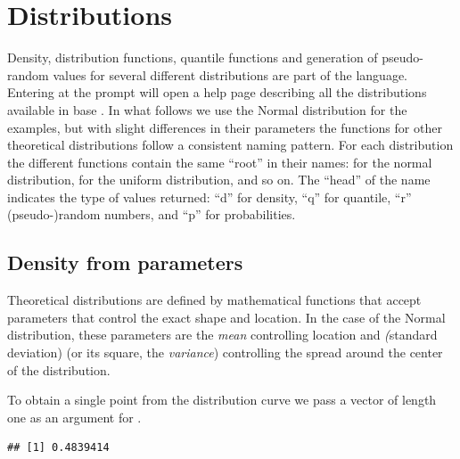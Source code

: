 \documentclass[krantz2]{krantz}\usepackage{knitr}
\begin{document}
\section{Distributions}
Density, distribution functions, quantile functions and generation of pseudo-random values for several different distributions are part of the \Rlang language. Entering  at the \Rlang prompt will open a help page describing all the distributions available in base \Rlang. In what follows we use the Normal distribution for the examples, but with slight differences in their parameters the functions for other theoretical distributions follow a consistent naming pattern. For each distribution the different functions contain the same ``root'' in their names:  for the normal distribution,  for the uniform distribution, and so on. The ``head'' of the name indicates the type of values returned: ``d'' for density, ``q'' for quantile, ``r'' (pseudo-)random numbers, and ``p'' for probabilities.

\subsection{Density from parameters}
Theoretical distributions are defined by mathematical functions that accept parameters that control the exact shape and location. In the case of the Normal distribution, these parameters are the \emph{mean} controlling location and \emph(standard deviation) (or its square, the \emph{variance}) controlling the spread around the center of the distribution.

To obtain a single point from the distribution curve we pass a vector of length one as an argument for .

\begin{knitrout}\footnotesize
{}\color{fgcolor}\begin{kframe}
\begin{alltt}
\hlstd{(} \hlstd{=} \hlstd{,}  \hlstd{=} \hlstd{,}  \hlstd{=} \hlstd{)}
\end{alltt}
\begin{verbatim}
## [1] 0.4839414
\end{verbatim}
\end{kframe}
\end{knitrout}
\end{document}
